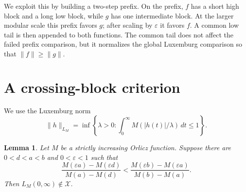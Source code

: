 \documentclass[11pt]{article}
\newtheorem{lemma}{Lemma}
\newcommand{\Xclass}{\mathcal X}
\begin{document}
We exploit this by building a two-step prefix. On the prefix, $f$ has a short
high block and a long low block, while $g$ has one intermediate block. At the
larger modular scale this prefix favors $g$; after scaling by $\varepsilon$ it
favors $f$. A common low tail is then appended to both functions. The common
tail does not affect the failed prefix comparison, but it normalizes the global
Luxemburg comparison so that $\|f\|\ge \|g\|$.

\section*{A crossing-block criterion}

We use the Luxemburg norm
\[
 \|h\|_{L_M}=\inf\left\{\lambda>0:
 \int_0^\infty M(|h(t)|/\lambda)\,dt\le 1\right\}.
\]

\begin{lemma}
\label{lem:block}
Let $M$ be a strictly increasing Orlicz function. Suppose there are
$0<d<a<b$ and $0<\varepsilon<1$ such that
\[
\frac{M(\varepsilon a)-M(\varepsilon d)}{M(a)-M(d)}
<
\frac{M(\varepsilon b)-M(\varepsilon a)}{M(b)-M(a)}.
\tag{1}
\label{eq:increment}
\]
Then $L_M(0,\infty)\notin \Xclass$.
\end{lemma}
\end{document}
